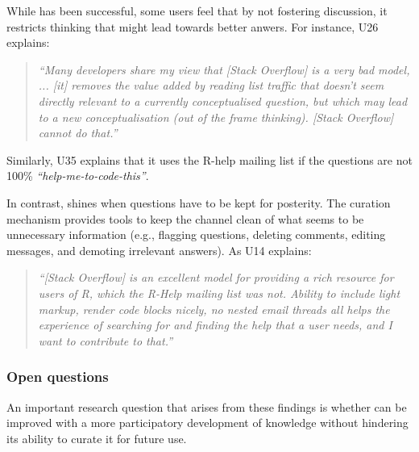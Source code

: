 While \SO  has been successful, some users feel that by not fostering discussion, it restricts thinking that might lead towards better anwers. 
For instance, U26 explains:
    \begin{quote}
        \textit{``Many developers share my view that [Stack Overflow] is a very bad model, ... [it] removes the value added by reading list traffic that doesn't seem directly relevant to a currently conceptualised question, but which may lead to a new conceptualisation (out of the frame thinking). [Stack Overflow] cannot do that.''}
    \end{quote}
    Similarly, U35 explains that it uses the R-help mailing list if the questions are not 100\% \textit{``help-me-to-code-this''}.

    In contrast, \SO shines when questions have to be kept for posterity. 
    The curation mechanism provides tools to keep the channel clean of what seems to be unnecessary information (e.g., flagging questions, deleting comments, editing messages, and demoting irrelevant answers). As U14 explains:

    \begin{quote}
        \textit{``[Stack Overflow] is an excellent model for providing a rich resource for users of R, which the R-Help mailing list was not. 
        Ability to include light markup, render code blocks nicely, no nested email threads all helps the experience of searching for and finding the help that a user needs, and I want to contribute to that.''}
    \end{quote}


\subsubsection{Open questions}

An important research question that arises from these findings is whether \SO can be improved with a more participatory development of knowledge without
hindering its ability to curate it for future use.

